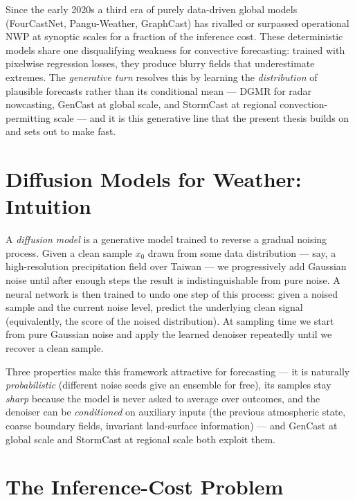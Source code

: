 Since the early 2020s a third era of purely data-driven global models (FourCastNet, Pangu-Weather, GraphCast) has rivalled or surpassed operational NWP at synoptic scales for a fraction of the inference cost. These deterministic models share one disqualifying weakness for convective forecasting: trained with pixelwise regression losses, they produce blurry fields that underestimate extremes. The \emph{generative turn} resolves this by learning the \emph{distribution} of plausible forecasts rather than its conditional mean --- DGMR for radar nowcasting, GenCast at global scale, and StormCast at regional convection-permitting scale --- and it is this generative line that the present thesis builds on and sets out to make fast.

\section{Diffusion Models for Weather: Intuition}
\label{sec:intro-diffusion}

A \emph{diffusion model} is a generative model trained to reverse a gradual noising process. Given a clean sample $x_0$ drawn from some data distribution --- say, a high-resolution precipitation field over Taiwan --- we progressively add Gaussian noise until after enough steps the result is indistinguishable from pure noise. A neural network is then trained to undo one step of this process: given a noised sample and the current noise level, predict the underlying clean signal (equivalently, the score of the noised distribution). At sampling time we start from pure Gaussian noise and apply the learned denoiser repeatedly until we recover a clean sample.

Three properties make this framework attractive for forecasting --- it is naturally \emph{probabilistic} (different noise seeds give an ensemble for free), its samples stay \emph{sharp} because the model is never asked to average over outcomes, and the denoiser can be \emph{conditioned} on auxiliary inputs (the previous atmospheric state, coarse boundary fields, invariant land-surface information) --- and GenCast at global scale and StormCast at regional scale both exploit them.

\section{The Inference-Cost Problem}
\label{sec:intro-cost}

